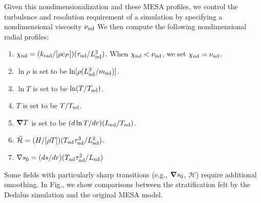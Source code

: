 Given this nondimensionalization and these MESA profiles, we control the turbulence and resolution requirement of a simulation by specifying a nondimensional viscosity $\nu_{\rm{nd}}$
We then compute the following nondimensional radial profiles:
\begin{enumerate}
    \item $\chi_{\rm{nd}} = (k_{\rm{rad}}/[\rho c_P])(\tau_{\mathrm{nd}}/L_{\mathrm{nd}}^2)$. When $\chi_{\rm{nd}} < \nu_{\rm{nd}}$, we set $\chi_{\rm{nd}} = \nu_{\rm{nd}}$.
    \item $\ln\rho$ is set to be $\ln[\rho (L_{\mathrm{nd}}^3/m_{\mathrm{nd}})]$.
    \item $\ln T$ is set to be $\ln(T / T_{\mathrm{nd}})$.
    \item $T$ is set to be $T/T_{\mathrm{nd}}$.
    \item $\boldsymbol{\nabla} T$ is set to be $(d\ln T/dr)(L_{\mathrm{nd}}/T_{\mathrm{nd}})$.
    \item $\tilde{\mathcal{H}} = (H/[\rho T]) (T_{\mathrm{nd}}\tau_{\mathrm{nd}}^3/L_{\mathrm{nd}}^2)$.
    \item $\nabla s_0 = (ds/dr) (T_{\mathrm{nd}}\tau_{\mathrm{nd}}^2/L_{\mathrm{nd}})$
\end{enumerate}

Some fields with particularly sharp transitions (e.g., $\boldsymbol{\nabla} s_0$, $\mathcal{H}$) require additional smoothing.
In Fig., we show comparisons between the stratification felt by the Dedalus simulation and the original MESA model.

